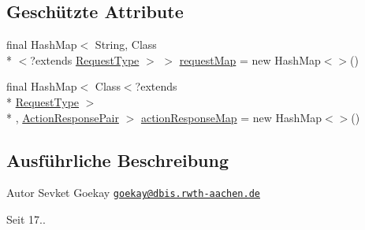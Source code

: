 \subsection*{Geschützte Attribute}
\begin{DoxyCompactItemize}
\item 
final Hash\-Map$<$ String, Class\\*
$<$?extends \hyperlink{interfacede_1_1rwth_1_1idsg_1_1steve_1_1ocpp_1_1_request_type}{Request\-Type} $>$ $>$ \hyperlink{classde_1_1rwth_1_1idsg_1_1steve_1_1ocpp_1_1ws_1_1_abstract_type_store_a591ed9920192486ad695bbad5463cdc8}{request\-Map} = new Hash\-Map$<$$>$()
\item 
final Hash\-Map$<$ Class$<$?extends \\*
\hyperlink{interfacede_1_1rwth_1_1idsg_1_1steve_1_1ocpp_1_1_request_type}{Request\-Type} $>$\\*
, \hyperlink{classde_1_1rwth_1_1idsg_1_1steve_1_1ocpp_1_1ws_1_1data_1_1_action_response_pair}{Action\-Response\-Pair} $>$ \hyperlink{classde_1_1rwth_1_1idsg_1_1steve_1_1ocpp_1_1ws_1_1_abstract_type_store_ac58fed0b3c17c657e6dea4e1310c667f}{action\-Response\-Map} = new Hash\-Map$<$$>$()
\end{DoxyCompactItemize}


\subsection{Ausführliche Beschreibung}
\begin{DoxyAuthor}{Autor}
Sevket Goekay \href{mailto:goekay@dbis.rwth-aachen.de}{\tt goekay@dbis.\-rwth-\/aachen.\-de} 
\end{DoxyAuthor}
\begin{DoxySince}{Seit}
17.. 
\end{DoxySince}


